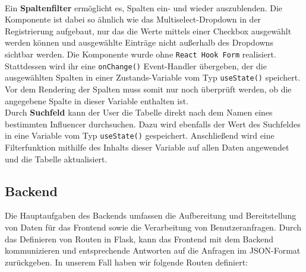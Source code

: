 \documentclass[conference,a4paper,flushend]{cs-techrep}
\begin{document}
\begin{enumerate}
\\
Ein \textbf{Spaltenfilter} ermöglicht es, Spalten ein- und wieder auszublenden. Die Komponente ist dabei so ähnlich wie das Multiselect-Dropdown in der Registrierung aufgebaut, nur das die Werte mittels einer Checkbox ausgewählt werden können und ausgewählte Einträge nicht außerhalb des Dropdowns sichtbar werden. Die Komponente wurde ohne \texttt{React Hook Form} realisiert. Stattdessen wird ihr eine \texttt{onChange()} Event-Handler übergeben, der die ausgewählten Spalten in einer Zustands-Variable vom Typ \texttt{useState()} speichert. Vor dem Rendering der Spalten muss somit nur noch überprüft werden, ob die angegebene Spalte in dieser Variable enthalten ist. 
\\
Durch \textbf{Suchfeld} kann der User die Tabelle direkt nach dem Namen eines bestimmten Influencer durchsuchen. Dazu wird ebenfalls der Wert des Suchfeldes in eine Variable vom Typ \texttt{useState()} gespeichert. Anschließend wird eine Filterfunktion mithilfe des Inhalts dieser Variable auf allen Daten angewendet und die Tabelle aktualisiert.
\end{enumerate}

\subsection{Backend}
Die Hauptaufgaben des Backends umfassen die Aufbereitung und Bereitstellung von Daten für das Frontend sowie die Verarbeitung von Benutzeranfragen. Durch das Definieren von Routen in Flask, kann das Frontend mit dem Backend kommunizieren und entsprechende Antworten auf die Anfragen im JSON-Format zurückgeben. In unserem Fall haben wir folgende Routen definiert:
\end{document}
